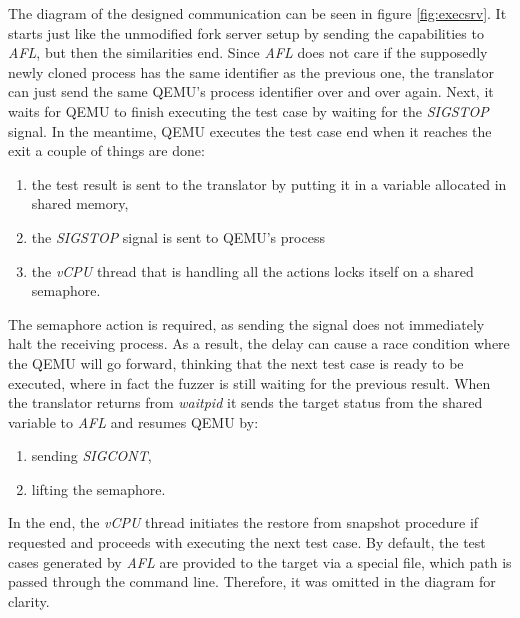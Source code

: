 The diagram of the designed communication can be seen in figure \ref{fig:execsrv}. It starts just like the unmodified fork server setup by sending the capabilities to \textit{AFL}, but then the similarities end. Since \textit{AFL} does not care if the supposedly newly cloned process has the same identifier as the previous one, the translator can just send the same QEMU's process identifier over and over again. Next, it waits for QEMU to finish executing the test case by waiting for the \textit{SIGSTOP} signal. In the meantime, QEMU executes the test case end when it reaches the exit a couple of things are done:
\begin{enumerate}
    \item the test result is sent to the translator by putting it in a variable allocated in shared memory,
    \item the \textit{SIGSTOP} signal is sent to QEMU's process
    \item the \textit{vCPU} thread that is handling all the actions locks itself on a shared semaphore.
\end{enumerate}
The semaphore action is required, as sending the signal does not immediately halt the receiving process. As a result, the delay can cause a race condition where the QEMU will go forward, thinking that the next test case is ready to be executed, where in fact the fuzzer is still waiting for the previous result. When the translator returns from \textit{waitpid} it sends the target status from the shared variable to \textit{AFL} and resumes QEMU by:
\begin{enumerate}
    \item sending \textit{SIGCONT},
    \item lifting the semaphore.
\end{enumerate}
In the end, the \textit{vCPU} thread initiates the restore from snapshot procedure if requested and proceeds with executing the next test case. By default, the test cases generated by \textit{AFL} are provided to the target via a special file, which path is passed through the command line. Therefore, it was omitted in the diagram for clarity.


